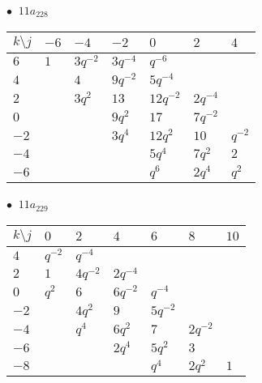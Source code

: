 \begin{minipage}{\linewidth}
$\bullet\ $ $11a_{228}$ \vspace{0.5em} \\
\begin{tabular}{l|llllll}
$k \setminus j$ & $-6$ & $-4$ & $-2$ & $0$ & $2$ & $4$ \\
\hline
$6$ & $1$ & $3q^{-2}$ & $3q^{-4}$ & $q^{-6}$ &  &  \\
$4$ &  & $4$ & $9q^{-2}$ & $5q^{-4}$ &  &  \\
$2$ &  & $3q^{2}$ & $13$ & $12q^{-2}$ & $2q^{-4}$ &  \\
$0$ &  &  & $9q^{2}$ & $17$ & $7q^{-2}$ &  \\
$-2$ &  &  & $3q^{4}$ & $12q^{2}$ & $10$ & $q^{-2}$ \\
$-4$ &  &  &  & $5q^{4}$ & $7q^{2}$ & $2$ \\
$-6$ &  &  &  & $q^{6}$ & $2q^{4}$ & $q^{2}$ \\
\end{tabular}
\vspace{2em}
\end{minipage}
%
\begin{minipage}{\linewidth}
$\bullet\ $ $11a_{229}$ \vspace{0.5em} \\
\begin{tabular}{l|llllll}
$k \setminus j$ & $0$ & $2$ & $4$ & $6$ & $8$ & $10$ \\
\hline
$4$ & $q^{-2}$ & $q^{-4}$ &  &  &  &  \\
$2$ & $1$ & $4q^{-2}$ & $2q^{-4}$ &  &  &  \\
$0$ & $q^{2}$ & $6$ & $6q^{-2}$ & $q^{-4}$ &  &  \\
$-2$ &  & $4q^{2}$ & $9$ & $5q^{-2}$ &  &  \\
$-4$ &  & $q^{4}$ & $6q^{2}$ & $7$ & $2q^{-2}$ &  \\
$-6$ &  &  & $2q^{4}$ & $5q^{2}$ & $3$ &  \\
$-8$ &  &  &  & $q^{4}$ & $2q^{2}$ & $1$ \\
\end{tabular}
\vspace{2em}
\end{minipage}
%
